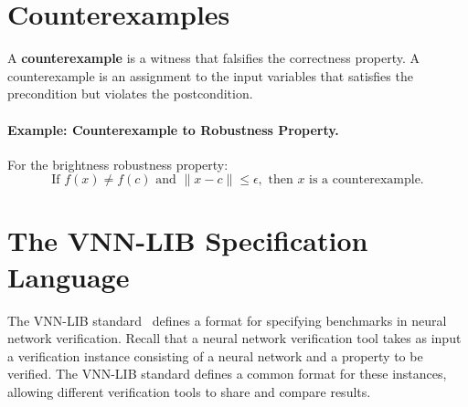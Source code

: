 


\section{Counterexamples}
A \textbf{counterexample} is a witness that falsifies the correctness property. A counterexample is an assignment to the input variables that satisfies the precondition but violates the postcondition.

\paragraph{Example: Counterexample to Robustness Property.}
For the brightness robustness property:
\[
\text{If } f(x) \neq f(c) \text{ and } \|x - c\| \leq \epsilon, \text{ then } x \text{ is a counterexample.}
\]



\section{The VNN-LIB  Specification Language}


The VNN-LIB standard~\cite{demarchi2023supporting,vnnlib} defines a format for specifying benchmarks in neural network verification. 
Recall that a neural network verification tool takes as input a verification instance consisting of a neural network and a property to be verified. The VNN-LIB standard defines a common format for these instances, allowing different verification tools to share and compare results.

